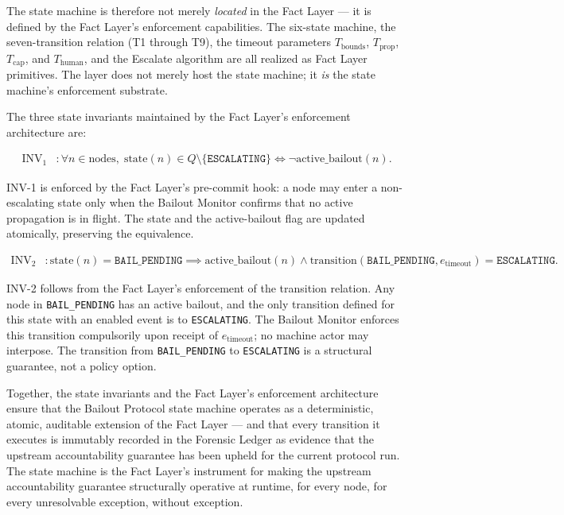 The state machine is therefore not merely \emph{located} in the Fact Layer — it is defined by the Fact Layer's enforcement capabilities. The six-state machine, the seven-transition relation (T1 through T9), the timeout parameters $T_{\text{bounds}}$, $T_{\text{prop}}$, $T_{\text{cap}}$, and $T_{\text{human}}$, and the Escalate algorithm are all realized as Fact Layer primitives. The \fact{} layer does not merely host the state machine; it \emph{is} the state machine's enforcement substrate.

The three state invariants maintained by the Fact Layer's enforcement architecture are:

\begin{align}
\text{INV}_1 &: \forall n \in \text{nodes},\; \text{state}(n) \in Q \setminus \{\texttt{ESCALATING}\} \iff \neg\text{active\_bailout}(n). \tag{INV-1}
\end{align}

INV-1 is enforced by the Fact Layer's pre-commit hook: a node may enter a non-escalating state only when the Bailout Monitor confirms that no active propagation is in flight. The state and the active-bailout flag are updated atomically, preserving the equivalence.

\begin{align}
\text{INV}_2 &: \text{state}(n) = \texttt{BAIL\_PENDING} \implies \text{active\_bailout}(n) \land \text{transition}(\texttt{BAIL\_PENDING}, e_{\text{timeout}}) = \texttt{ESCALATING}. \tag{INV-2}
\end{align}

INV-2 follows from the Fact Layer's enforcement of the transition relation. Any node in \texttt{BAIL\_PENDING} has an active bailout, and the only transition defined for this state with an enabled event is to \texttt{ESCALATING}. The Bailout Monitor enforces this transition compulsorily upon receipt of $e_{\text{timeout}}$; no machine actor may interpose. The transition from \texttt{BAIL\_PENDING} to \texttt{ESCALATING} is a structural guarantee, not a policy option.

Together, the state invariants and the Fact Layer's enforcement architecture ensure that the Bailout Protocol state machine operates as a deterministic, atomic, auditable extension of the Fact Layer — and that every transition it executes is immutably recorded in the Forensic Ledger as evidence that the upstream accountability guarantee has been upheld for the current protocol run. The state machine is the Fact Layer's instrument for making the upstream accountability guarantee structurally operative at runtime, for every node, for every unresolvable exception, without exception.